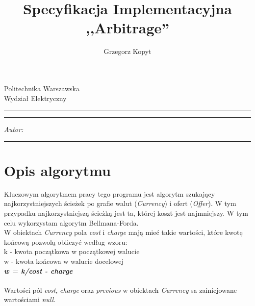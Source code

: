 \documentclass[a4paper,11pt]{article}
\author{Grzegorz Kopyt}
\title{Specyfikacja Implementacyjna \\
,,Arbitrage''}
\makeatletter
\newcommand{\linia}{\rule{\linewidth}{0.4mm}}
\renewcommand{\maketitle}{\begin{titlepage}
    \vspace*{2cm}
    \begin{center}\LARGE
    Politechnika Warszawska\\
    Wydział Elektryczny\\
    \end{center}
    \vspace{5cm}
    \noindent\linia
    \begin{center}
      \LARGE \textsc{\@title}
         \end{center}
     \linia
    \vspace{0.5cm}
    \begin{flushright}
    \begin{minipage}{5cm}
    \textit{Autor:}\\
    \normalsize \textsc{\@author} \par
    \end{minipage}
    \vspace{5cm}
     \end{flushright}
    \vspace*{\stretch{6}}
    \begin{center}
    \@date
    \end{center}
  \end{titlepage}
}
\makeatother
\begin{document}
\maketitle

\tableofcontents
\vspace{1cm}
\noindent\linia
\section{Opis algorytmu}
Kluczowym algorytmem pracy tego programu jest algorytm szukający najkorzystniejszych ścieżek po grafie walut (\textit{Currency}) i ofert (\textit{Offer}). W tym przypadku najkorzystniejszą ścieżką jest ta, której koszt jest najmniejszy. W tym celu wykorzystam algorytm Bellmana-Forda.
\\
W obiektach \textit{Currency} pola \textit{cost} i \textit{charge} mają mieć takie wartości, które kwotę końcową pozwolą obliczyć według wzoru:
\\k - kwota początkowa w początkowej walucie
\\w - kwota końcowa w walucie docelowej
\\
\textbf{\emph{w = k/cost - charge}}
\\
\\Wartości pól \textit{cost}, \textit{charge} oraz \textit{previous} w obiektach \textit{Currency} sa zainicjowane wartościami \textit{null}.
\\
\end{document}
